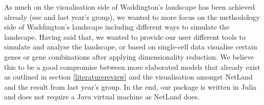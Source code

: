 As much on the visualisation side of Waddington's landscape has been achieved already (see \cite{netland} and last year's group), we wanted to more focus on the methodology side of Waddington's landscape including different ways to simulate the landscape. Having said that, we wanted to provide our user different tools to simulate and analyse the landscape, or based on single-cell data visualise certain genes or gene combinations after applying dimensionality reduction. We believe this to be a good compromise between more elaborated models that already exist as outlined in section \ref{literaturereview} and the visualisation amongst NetLand and the result from last year's group. In the end, our package is written in Julia and does not require a Java virtual machine as NetLand does.




%
%
%
%
%
%


%
%
%
%
%
%
%
%




